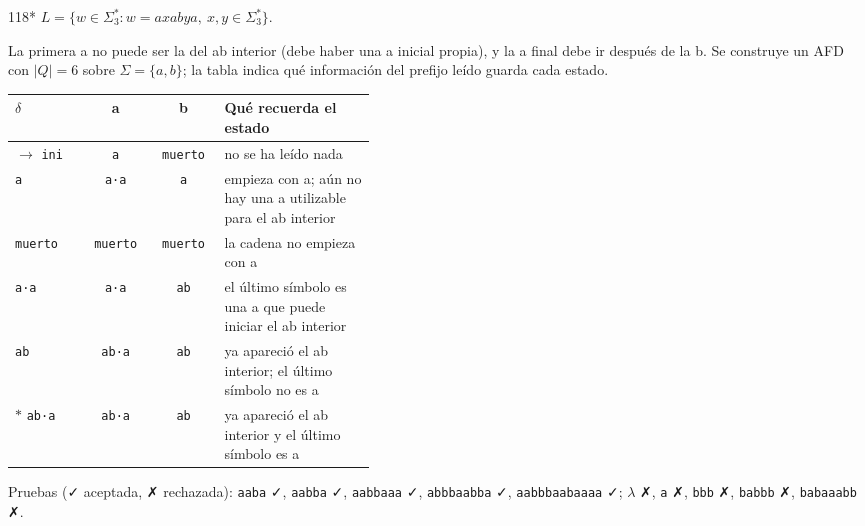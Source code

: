 \documentclass[11pt]{article}
\begin{document}
\begin{ejercicio}{118}{*}
$L = \{w \in \Sigma_3^* : w = axabya,\ x, y \in \Sigma_3^*\}$.
\end{ejercicio}
\proc La primera a no puede ser la del ab interior (debe haber una a inicial propia), y la a final debe ir después de la b. Se construye un AFD con $|Q| = 6$ sobre $\Sigma = \{a, b\}$; la tabla indica qué información del prefijo leído guarda cada estado.
\begin{center}\small\begin{tabular}{lccp{0.42\linewidth}}\toprule
$\delta$ & a & b & Qué recuerda el estado \\\midrule
$\to$ \texttt{ini} & \texttt{a} & \texttt{muerto} & no se ha leído nada \\
 \texttt{a} & \texttt{a·a} & \texttt{a} & empieza con a; aún no hay una a utilizable para el ab interior \\
 \texttt{muerto} & \texttt{muerto} & \texttt{muerto} & la cadena no empieza con a \\
 \texttt{a·a} & \texttt{a·a} & \texttt{ab} & el último símbolo es una a que puede iniciar el ab interior \\
 \texttt{ab} & \texttt{ab·a} & \texttt{ab} & ya apareció el ab interior; el último símbolo no es a \\
$*$ \texttt{ab·a} & \texttt{ab·a} & \texttt{ab} & ya apareció el ab interior y el último símbolo es a \\
\bottomrule\end{tabular}\end{center}
Pruebas (✓ aceptada, ✗ rechazada): \texttt{aaba} ✓, \texttt{aabba} ✓, \texttt{aabbaaa} ✓, \texttt{abbbaabba} ✓, \texttt{aabbbaabaaaa} ✓; $\lambda$ ✗, \texttt{a} ✗, \texttt{bbb} ✗, \texttt{babbb} ✗, \texttt{babaaabb} ✗.
\end{document}
